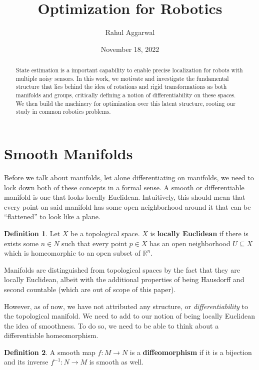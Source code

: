 \documentclass[reqno]{amsart}
\title{Optimization for Robotics}
\author{Rahul Aggarwal}
\date{November 18, 2022}
\theoremstyle{definition}
\newtheorem{defn}{Definition}[section]
\numberwithin{equation}{section}
\begin{document}
\begin{abstract}
    State estimation is a important capability to enable precise localization for robots with multiple noisy sensors. In this work, we motivate and investigate the fundamental structure that lies behind the idea of rotations and rigid transformations as both manifolds and groups, critically defining a notion of differentiability on these spaces. We then build the machinery for optimization over this latent structure, rooting our study in common robotics problems.
\end{abstract}

\maketitle

\tableofcontents

\section{Smooth Manifolds}

Before we talk about manifolds, let alone differentiating on manifolds, we need to lock down both of these concepts in a formal sense.
A smooth or differentiable manifold is one that looks locally Euclidean. Intuitively, this should mean that every point on said manifold has some open neighborhood around it that can be ``flattened'' to look like a plane.

\begin{defn}
    Let $X$ be a topological space. $X$ is \textbf{locally Euclidean} if there is exists some $n \in N$ such that every point $p \in X$ has an open neighborhood $U \subseteq X$ which is homeomorphic to an open subset of $\mathbb{R}^n$.
\end{defn}

Manifolds are distinguished from topological spaces by the fact that they are locally Euclidean, albeit with the additional properties of being Hausdorff and second countable (which are out of scope of this paper).

However, as of now, we have not attributed any structure, or \textit{differentiability} to the topological manifold. We need to add to our notion of being locally Euclidean the idea of smoothness. To do so, we need to be able to think about a differentiable homeomorphism.

\begin{defn}
    A smooth map $f: M \to N$ is a \textbf{diffeomorphism} if it is a bijection and its inverse $f^{-1}: N \to M$ is smooth as well.
\end{defn}
\end{document}
